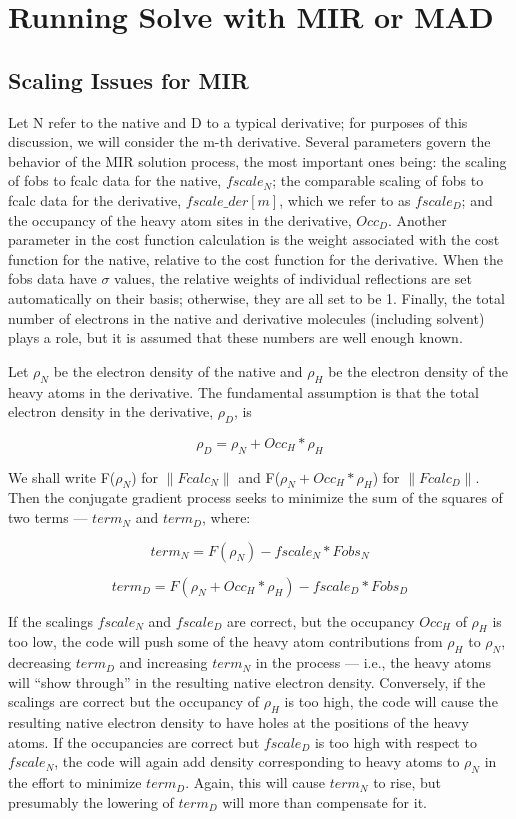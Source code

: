 \documentclass{report}
\begin{document}
\section {Running Solve with MIR or MAD}
\label{mir-solve}

\subsection {Scaling Issues for MIR}
\label{mir-solve-scaling}

Let N refer to the native and D to a typical derivative; for purposes
of this discussion, we will consider the m-th derivative.  Several
parameters govern the behavior of the MIR solution process, the most
important ones being:  the scaling of fobs to fcalc data for the native,
$fscale_N$; the comparable scaling of fobs to fcalc data for the
derivative, $fscale\_der[m]$, which we refer to as $fscale_D$; 
and the occupancy of the heavy atom sites in the
derivative, $Occ_D$.  Another parameter in the cost function calculation 
is the weight associated with the cost function for the native, 
relative to the cost function for the derivative.  When the fobs data 
have $\sigma$ values, the relative weights of individual reflections
are set automatically on their basis;
otherwise, they are all set to be 1.
Finally, the total number of electrons in the native
and derivative molecules (including solvent) plays a role, but it is
assumed that these numbers are well enough known.

\vspace {0.1in}

Let $\rho_N$ be the electron density of the native and $\rho_H$ be the
electron density of the heavy atoms in the derivative.  The fundamental
assumption is that the total electron density in the derivative, $\rho_D$, is

$$  \rho_D = \rho_N + Occ_H*\rho_H $$

We shall write F($\rho_N$) for $\|Fcalc_N\|$ and 
F($\rho_N + Occ_H*\rho_H$) for $\|Fcalc_D\|$.  
Then the
conjugate gradient process seeks to minimize the sum of the squares of
two terms --- $term_N$ and $term_D$,  where:

$$  term_N = F(\rho_N) - fscale_N * Fobs_N $$

$$  term_D = F(\rho_N + Occ_H*\rho_H) - fscale_D * Fobs_D $$

If the scalings $fscale_N$ and $fscale_D$ are correct, 
but the occupancy $Occ_H$ of $\rho_H$
is too low, the code will push some of the heavy atom contributions
from $\rho_H$ to $\rho_N$, decreasing $term_D$ and increasing $term_N$ in the
process --- i.e., the heavy atoms will ``show through'' in the resulting
native electron density.  Conversely, if the scalings are correct
but the occupancy of $\rho_H$ is too high, the code will cause the
resulting native electron density to have holes at the positions of the
heavy atoms.
If the occupancies are correct but $fscale_D$ is too high with respect 
to $fscale_N$,
the code will again add density corresponding to heavy atoms to $\rho_N$ in
the effort to minimize $term_D$.  Again, this will cause $term_N$ to rise, but
presumably the lowering of $term_D$ will more than compensate for it.
\end{document}
